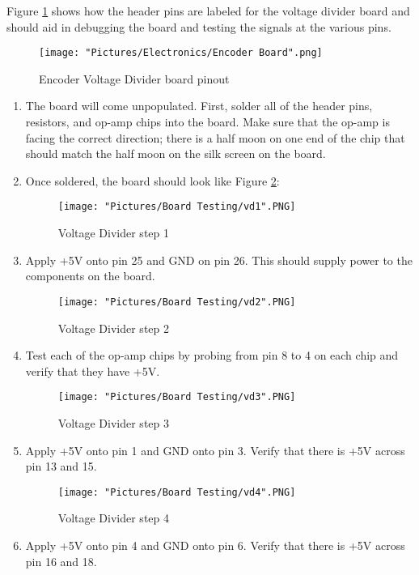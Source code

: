 \documentclass[12pt]{article}
\begin{document}
Figure \ref{vd pinout1} shows how the header pins are labeled for the voltage divider board and should aid in debugging the board and testing the signals at the various pins.
\begin{figure}[H]
 	\centering
	\texttt{[image: "Pictures/Electronics/Encoder Board".png]}
 	\caption{Encoder Voltage Divider board pinout}
	\label{vd pinout1}
\end{figure}


\begin{enumerate}
	\item The board will come unpopulated. First, solder all of the header pins, resistors, and op-amp chips into the board. Make sure that the op-amp is facing the correct direction; there is a half moon on one end of the chip that should match the half moon on the silk screen on the board. 
	\item Once soldered, the board should look like Figure \ref{vd1}:
		\begin{figure}[H]
		 	\centering
			\texttt{[image: "Pictures/Board Testing/vd1".PNG]}
		 	\caption{Voltage Divider step 1}
			\label{vd1}
		\end{figure}
	\item Apply +5V onto pin 25 and GND on pin 26. This should supply power to the components on the board.
		\begin{figure}[H]
		 	\centering
			\texttt{[image: "Pictures/Board Testing/vd2".PNG]}
		 	\caption{Voltage Divider step 2}
			\label{vd2}
		\end{figure}
	\item Test each of the op-amp chips by probing from pin 8 to 4 on each chip and verify that they have +5V.
		\begin{figure}[H]
		 	\centering
			\texttt{[image: "Pictures/Board Testing/vd3".PNG]}
		 	\caption{Voltage Divider step 3}
			\label{vd3}
		\end{figure}
	\item Apply +5V onto pin 1 and GND onto pin 3. Verify that there is +5V across pin 13 and 15.
		\begin{figure}[H]
		 	\centering
			\texttt{[image: "Pictures/Board Testing/vd4".PNG]}
		 	\caption{Voltage Divider step 4}
			\label{vd4}
		\end{figure}
	\item Apply +5V onto pin 4 and GND onto pin 6. Verify that there is +5V across pin 16 and 18.
		\begin{figure}[H]

\end{figure}
\end{enumerate}
\end{document}
